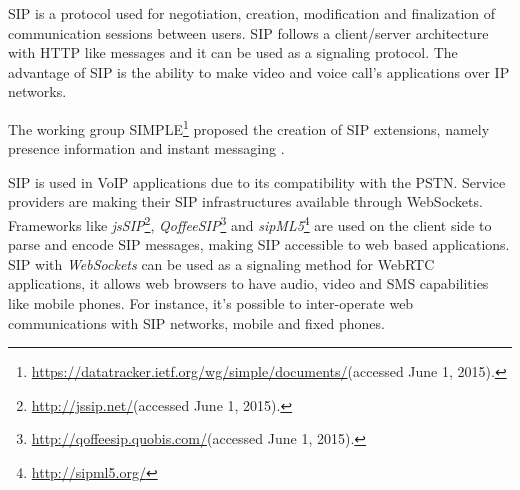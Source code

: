   \ac{SIP} \cite{rfc3261} is a protocol used for negotiation, creation, modification and finalization of communication sessions between users. \ac{SIP} follows a client/server architecture with \ac{HTTP} like messages and it can be used as a signaling protocol. The advantage of \ac{SIP} is the ability to make video and voice call's applications over \ac{IP} networks.

  The working group \ac{SIMPLE}\footnote{\url{https://datatracker.ietf.org/wg/simple/documents/}(accessed June 1, 2015).} proposed the creation of \ac{SIP} extensions, namely presence information \cite{rfc5263} and instant messaging \cite{rfc3428}.

  \ac{SIP} is used in \ac{VoIP} applications due to its compatibility with the \ac{PSTN}.
  Service providers are making their \ac{SIP} infrastructures available through WebSockets.
  Frameworks like \emph{jsSIP}\footnote{\url{http://jssip.net/}(accessed June 1, 2015).}, \emph{QoffeeSIP}\footnote{\url{http://qoffeesip.quobis.com/}(accessed June 1, 2015).} and \emph{sipML5}\footnote{\url{http://sipml5.org/}} are used on the client side to parse and encode \ac{SIP} messages, making \ac{SIP} accessible to web based applications. 
  \ac{SIP} with \emph{WebSockets} can be used as a signaling method for \ac{WebRTC} applications, it allows web browsers to have audio, video and \ac{SMS} capabilities like mobile phones. For instance, it's possible to inter-operate web communications with \ac{SIP} networks, mobile and fixed phones.

